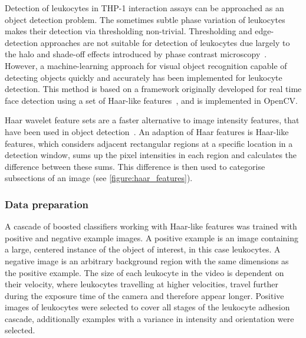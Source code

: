 Detection of leukocytes in THP-1 interaction assays can be approached as an object detection problem. The sometimes subtle phase variation of leukocytes makes their detection via thresholding non-trivial. Thresholding and edge-detection approaches are not suitable for detection of leukocytes due largely to the halo and shade-off effects introduced by phase contrast microscopy~\cite{Yin2012}. However, a machine-learning approach for visual object recognition capable of detecting objects quickly and accurately has been implemented for leukocyte detection. This method is based on a framework originally developed for real time face detection using a set of Haar-like features~\cite{Viola2001, Lienhart2002}, and is implemented in OpenCV.

Haar wavelet feature sets are a faster alternative to image intensity features, that have been used in object detection~\cite{Papageorgiou1998}. An adaption of Haar features is Haar-like features, which considers adjacent rectangular regions at a specific location in a detection window, sums up the pixel intensities in each region and calculates the difference between these sums. This difference is then used to categorise subsections of an image (see \autoref{figure:haar_features}).

\subsubsection{Data preparation}
A cascade of boosted classifiers working with Haar-like features was trained with positive and negative example images. A positive example is an image containing a large, centered instance of the object of interest, in this case leukocytes. A negative image is an arbitrary background region with the same dimensions as the positive example. The size of each leukocyte in the video is dependent on their velocity, where leukocytes travelling at higher velocities, travel further during the exposure time of the camera and therefore appear longer. Positive images of leukocytes were selected to cover all stages of the leukocyte adhesion cascade, additionally examples with a variance in intensity and orientation were selected.

